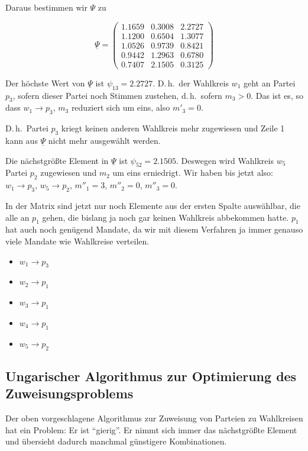 Daraus bestimmen wir $\Psi$ zu

\[
  \underline{\Psi} = \begin{pmatrix}
    1.1659 & 0.3008 & 2.2727 \\
    1.1200 & 0.6504 & 1.3077 \\
    1.0526 & 0.9739 & 0.8421 \\
    0.9442 & 1.2963 & 0.6780 \\
    0.7407 & 2.1505 & 0.3125
  \end{pmatrix}
\]

Der höchste Wert von $\underline{\Psi}$ ist $\psi_{13} = 2.2727$. D.\,h.\ der Wahlkreis $w_1$
geht an Partei $p_3$, sofern dieser Partei noch Stimmen zustehen, d.\,h.\ sofern $m_3 > 0$. Das
ist es, so dass $w_1 \longrightarrow p_3$, $m_3$ reduziert sich um eins, also $m'_3 = 0$.

D.\,h.\ Partei $p_3$ kriegt keinen anderen Wahlkreis mehr zugewiesen und Zeile 1 kann aus
$\underline{\Psi}$ nicht mehr ausgewählt werden.

Die nächstgrößte Element in $\underline{\Psi}$ ist $\psi_{52} = 2.1505$. Deswegen wird Wahlkreis
$w_5$ Partei $p_2$ zugewiesen und $m_2$ um eins erniedrigt. Wir haben bis jetzt also:
$w_1 \longrightarrow p_3$, $w_5 \longrightarrow p_2$, $m''_1 = 3$, $m''_2 = 0$, $m''_3 = 0$.

In der Matrix sind jetzt nur noch Elemente aus der ersten Spalte auswählbar, die alle an $p_1$
gehen, die bislang ja noch gar keinen Wahlkreis abbekommen hatte. $p_1$ hat auch noch genügend
Mandate, da wir mit diesem Verfahren ja immer genauso viele Mandate wie Wahlkreise verteilen.


\begin{itemize}[label={}]
  \item $w_1 \longrightarrow p_3$
  \item $w_2 \longrightarrow p_1$
  \item $w_3 \longrightarrow p_1$
  \item $w_4 \longrightarrow p_1$
  \item $w_5 \longrightarrow p_2$
\end{itemize}

\subsection{Ungarischer Algorithmus zur Optimierung des Zuweisungsproblems}

Der oben vorgeschlagene Algorithmus zur Zuweisung von Parteien zu Wahlkreisen hat ein Problem: Er
ist \enquote{gierig}. Er nimmt sich immer das nächstgrößte Element und übersieht dadurch manchmal
günstigere Kombinationen.


